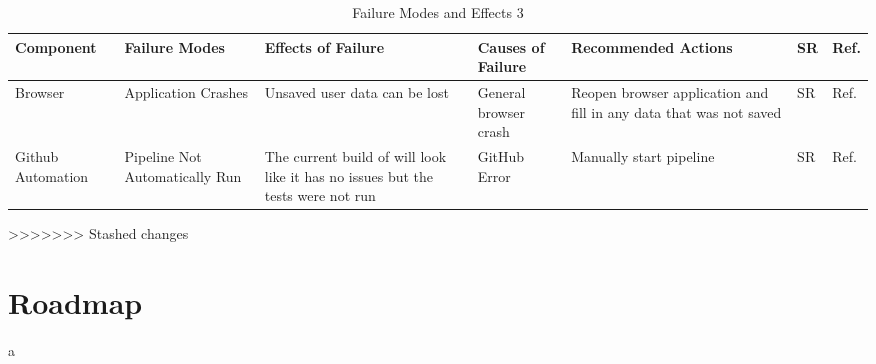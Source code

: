 \documentclass[12pt]{article}
\begin{document}
\begin{landscape}
\begin{table}[hp]
\begin{tabularx}{\linewidth}{| l | X X l X l l |}
		\hline
		\end{tabularx}
\end{table}
\newpage
\begin{table}[hp]
	\caption{Failure Modes and Effects 3} \label{TblFMEA3}
	\begin{tabularx}{\linewidth}{| l | X X l X l l |}
		\hline
		Component & Failure Modes & Effects of Failure & Causes of Failure & Recommended Actions & SR & Ref. \\
		\hline
		Browser & Application Crashes & Unsaved user data can be lost & General browser crash & Reopen browser application and fill in any data that was not saved & SR & Ref. \\
		\hline
		Github Automation & Pipeline Not Automatically Run & The current build of will look like it has no issues but the tests were not run & GitHub Error & Manually start pipeline & SR & Ref. \\
		\hline
		\end{tabularx}
\end{table}
\end{landscape}
>>>>>>> Stashed changes

\section{Roadmap}
a
\end{document}
